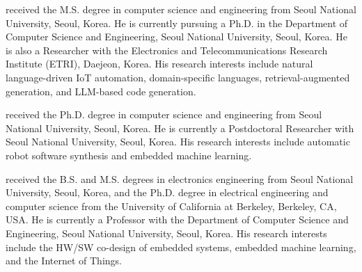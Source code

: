 \documentclass[10pt,twocolumn]{article}
\begin{document}
\FloatBarrier
\vspace{1em}

\vspace{0.7em}

 received the M.S. degree in computer science and engineering from Seoul National University, Seoul, Korea. He is currently pursuing a Ph.D. in the Department of Computer Science and Engineering, Seoul National University, Seoul, Korea. He is also a Researcher with the Electronics and Telecommunications Research Institute (ETRI), Daejeon, Korea. His research interests include natural language-driven IoT automation, domain-specific languages, retrieval-augmented generation, and LLM-based code generation.

\vspace{0.7em}

 received the Ph.D. degree in computer science and engineering from Seoul National University, Seoul, Korea. He is currently a Postdoctoral Researcher with Seoul National University, Seoul, Korea. His research interests include automatic robot software synthesis and embedded machine learning.

\vspace{0.7em}

 received the B.S. and M.S. degrees in electronics engineering from Seoul National University, Seoul, Korea, and the Ph.D. degree in electrical engineering and computer science from the University of California at Berkeley, Berkeley, CA, USA. He is currently a Professor with the Department of Computer Science and Engineering, Seoul National University, Seoul, Korea. His research interests include the HW/SW co-design of embedded systems, embedded machine learning, and the Internet of Things.

\balance
\end{document}
